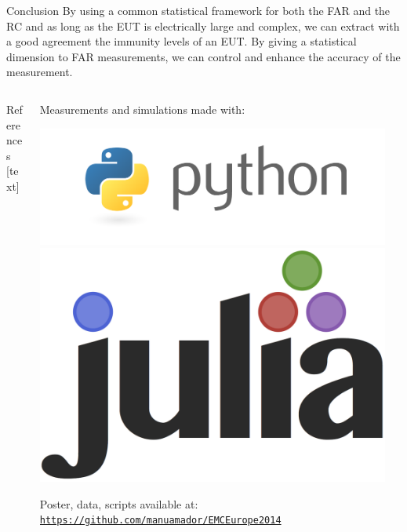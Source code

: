 \documentclass[final,hyperref={pdfpagelabels=false}]{beamer}
\begin{document}
\begin{frame}{}
\begin{block}{\Huge{Conclusion}} \justifying
\Large{By using a common statistical framework for both the FAR and the RC and as long as the EUT is electrically large and complex, we can extract with a good agreement the immunity levels of an EUT. By giving a statistical dimension to FAR measurements, we can control and enhance the accuracy of the measurement.}
	\end{block}%

\begin{columns}[t]

 \begin{column}{0.71\linewidth}
\vspace{-0.8cm}   
\begin{block}{References} %
{}[text]

 \small

	\end{block}

    \end{column}%

    \begin{column}{0.2\linewidth}
    \vspace{0.9cm}
 \hspace{-0.3cm}Measurements and simulations made with:\\
\centerline{\includegraphics[trim=150 120 120 60,clip,width=.4\columnwidth]{./img/python_logo.png}
\hspace{1cm} \includegraphics[width=.2\columnwidth]{./img/julia.png}}
\vspace{0.42cm}
Poster, data, scripts available at:\\\href{https://github.com/manuamador/EMCEurope2014}{\small{\texttt{https://github.com/manuamador/EMCEurope2014}}}
\end{column}%
\begin{column}{0.07\linewidth}


\end{column}
\end{columns}
\end{frame}
\end{document}
